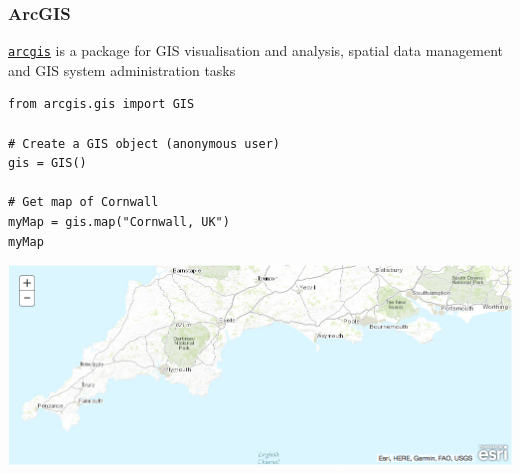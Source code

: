 \documentclass[pdf]{beamer}
\begin{document}
\begin{frame}[fragile]
\frametitle{ArcGIS}

\href{https://developers.arcgis.com/python/}{\texttt{arcgis}} is a package 
for GIS visualisation and analysis, spatial data management and GIS system
administration tasks

\vspace{0.2cm}

\begin{lstlisting}[style=python]
from arcgis.gis import GIS

# Create a GIS object (anonymous user)
gis = GIS()

# Get map of Cornwall
myMap = gis.map("Cornwall, UK")
myMap
\end{lstlisting}

\vspace{-0.5cm}

\centering
\includegraphics[width=.7\textwidth]{arcgis.png}

\end{frame}
\end{document}
